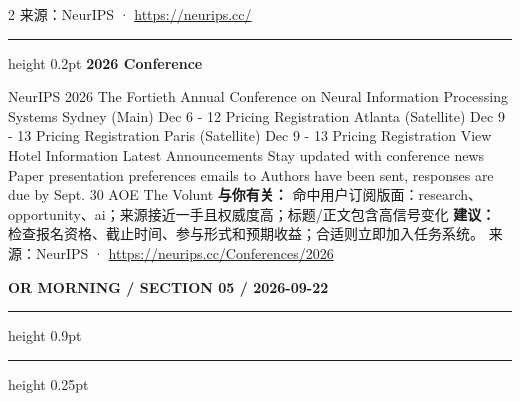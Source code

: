 \documentclass[10.5pt]{ctexart}
\begin{document}
\begin{multicols}{2}
{\footnotesize\color{ormuted} 来源：NeurIPS · \url{https://neurips.cc/}}
\vspace{2mm}
\hrule height 0.2pt
\vspace{2mm}
{\large\bfseries 2026 Conference}\par
NeurIPS 2026 The Fortieth Annual Conference on Neural Information Processing Systems Sydney (Main) Dec 6 - 12 Pricing Registration Atlanta (Satellite) Dec 9 - 13 Pricing Registration Paris (Satellite) Dec 9 - 13 Pricing Registration View Hotel Information Latest Announcements Stay updated with conference news Paper presentation preferences emails to Authors have been sent, responses are due by Sept. 30 AOE The Volunt
\textbf{与你有关：} 命中用户订阅版面：research、opportunity、ai；来源接近一手且权威度高；标题/正文包含高信号变化
\textbf{建议：} 检查报名资格、截止时间、参与形式和预期收益；合适则立即加入任务系统。
{\footnotesize\color{ormuted} 来源：NeurIPS · \url{https://neurips.cc/Conferences/2026}}
\end{multicols}
\newpage
{\small\bfseries OR MORNING / SECTION 05 / 2026-09-22}
\vspace{2mm}
\hrule height 0.9pt
\vspace{1.5mm}
\hrule height 0.25pt
\vspace{4mm}
\end{document}
